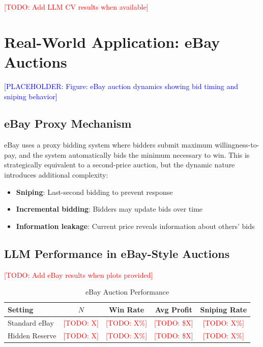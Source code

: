 \documentclass[12pt]{article}
\newcommand{\todo}[1]{\textcolor{red}{[TODO: #1]}}
\newcommand{\placeholder}[1]{\textcolor{blue}{[PLACEHOLDER: #1]}}
\begin{document}
\todo{Add LLM CV results when available}

\section{Real-World Application: eBay Auctions}

\placeholder{Figure: eBay auction dynamics showing bid timing and sniping behavior}

\subsection{eBay Proxy Mechanism}

eBay uses a proxy bidding system where bidders submit maximum willingness-to-pay, and the system automatically bids the minimum necessary to win. This is strategically equivalent to a second-price auction, but the dynamic nature introduces additional complexity:

\begin{itemize}
    \item \textbf{Sniping}: Last-second bidding to prevent response
    \item \textbf{Incremental bidding}: Bidders may update bids over time
    \item \textbf{Information leakage}: Current price reveals information about others' bids
\end{itemize}

\subsection{LLM Performance in eBay-Style Auctions}

\todo{Add eBay results when plots provided}

\begin{table}[h]
\centering
\caption{eBay Auction Performance}
\label{tab:ebay_results}
\begin{tabular}{lcccc}
\toprule
Setting & $N$ & Win Rate & Avg Profit & Sniping Rate \\
\midrule
Standard eBay & \todo{X} & \todo{X\%} & \todo{\$X} & \todo{X\%} \\
Hidden Reserve & \todo{X} & \todo{X\%} & \todo{\$X} & \todo{X\%} \\
\bottomrule
\end{tabular}
\end{table}
\end{document}
